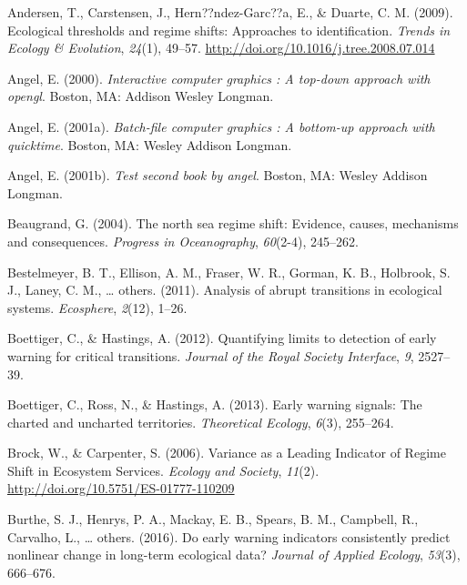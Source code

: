 \documentclass[12pt,twoside,openany]{reedthesis}
\begin{document}
\leavevmode\hypertarget{ref-andersen_ecological_2009}{}%
Andersen, T., Carstensen, J., Hern??ndez-Garc??a, E., \& Duarte, C. M. (2009). Ecological thresholds and regime shifts: Approaches to identification. \emph{Trends in Ecology \& Evolution}, \emph{24}(1), 49--57. \url{http://doi.org/10.1016/j.tree.2008.07.014}

\leavevmode\hypertarget{ref-angel2000}{}%
Angel, E. (2000). \emph{Interactive computer graphics : A top-down approach with opengl}. Boston, MA: Addison Wesley Longman.

\leavevmode\hypertarget{ref-angel2001}{}%
Angel, E. (2001a). \emph{Batch-file computer graphics : A bottom-up approach with quicktime}. Boston, MA: Wesley Addison Longman.

\leavevmode\hypertarget{ref-angel2002a}{}%
Angel, E. (2001b). \emph{Test second book by angel}. Boston, MA: Wesley Addison Longman.

\leavevmode\hypertarget{ref-beaugrand2004north}{}%
Beaugrand, G. (2004). The north sea regime shift: Evidence, causes, mechanisms and consequences. \emph{Progress in Oceanography}, \emph{60}(2-4), 245--262.

\leavevmode\hypertarget{ref-bestelmeyer_analysis_2011}{}%
Bestelmeyer, B. T., Ellison, A. M., Fraser, W. R., Gorman, K. B., Holbrook, S. J., Laney, C. M., \ldots{} others. (2011). Analysis of abrupt transitions in ecological systems. \emph{Ecosphere}, \emph{2}(12), 1--26.

\leavevmode\hypertarget{ref-boettiger_quantifying_2012}{}%
Boettiger, C., \& Hastings, A. (2012). Quantifying limits to detection of early warning for critical transitions. \emph{Journal of the Royal Society Interface}, \emph{9}, 2527--39.

\leavevmode\hypertarget{ref-boettiger_early_2013}{}%
Boettiger, C., Ross, N., \& Hastings, A. (2013). Early warning signals: The charted and uncharted territories. \emph{Theoretical Ecology}, \emph{6}(3), 255--264.

\leavevmode\hypertarget{ref-brock_variance_2006}{}%
Brock, W., \& Carpenter, S. (2006). Variance as a Leading Indicator of Regime Shift in Ecosystem Services. \emph{Ecology and Society}, \emph{11}(2). \url{http://doi.org/10.5751/ES-01777-110209}

\leavevmode\hypertarget{ref-burthe2016early}{}%
Burthe, S. J., Henrys, P. A., Mackay, E. B., Spears, B. M., Campbell, R., Carvalho, L., \ldots{} others. (2016). Do early warning indicators consistently predict nonlinear change in long-term ecological data? \emph{Journal of Applied Ecology}, \emph{53}(3), 666--676.
\end{document}
